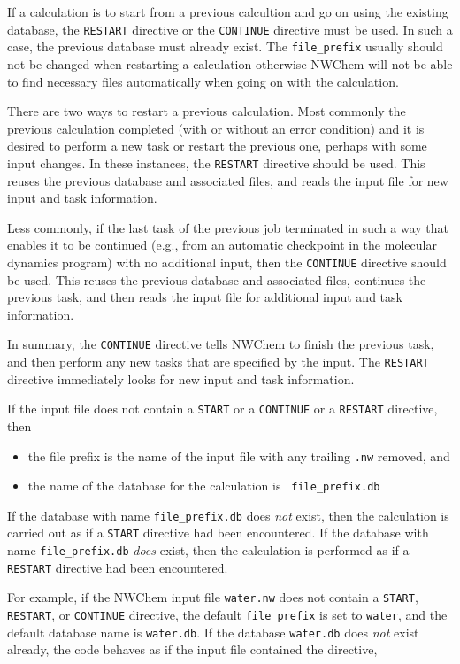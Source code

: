If a calculation is to start from a previous calcultion and go on
using the existing database, the \verb+RESTART+ directive or the
\verb+CONTINUE+ directive must be used.  In such a case, the previous
database must already exist.  The {\tt file\_prefix} usually should
not be changed when restarting a calculation otherwise NWChem will not
be able to find necessary files automatically when going on with the
calculation.

There are two ways to restart a previous calculation.  Most commonly
the previous calculation completed (with or without an error
condition) and it is desired to perform a new task or restart the
previous one, perhaps with some input changes.  In these instances,
the \verb+RESTART+ directive should be used.  This reuses the previous
database and associated files, and reads the input file for new input
and task information.

Less commonly, if the last task of the previous job terminated in such
a way that enables it to be continued (e.g., from an automatic
checkpoint in the molecular dynamics program) with no additional
input, then the \verb+CONTINUE+ directive should be used.  This reuses
the previous database and associated files, continues the previous
task, and then reads the input file for additional input and task
information.

In summary, the \verb+CONTINUE+ directive tells NWChem to finish the
previous task, and then perform any new tasks that are specified by
the input. The \verb+RESTART+ directive immediately looks for new
input and task information.

If the input file does not contain a \verb+START+ or a \verb+CONTINUE+ or a
\verb+RESTART+ directive, then
\begin{itemize}
  \item the file prefix is the name of the input file with any
    trailing \verb+.nw+ removed, and
  \item the name of the database for the calculation is {\tt
      file\_prefix.db}
\end{itemize}
If the database with name {\tt file\_prefix.db} does {\it not} exist,
then the calculation is carried out as if a \verb+START+ directive had
been encountered.  If the database with name {\tt file\_prefix.db}
{\it does} exist, then the calculation is performed as if a
\verb+RESTART+ directive had been encountered.  

For example, if the NWChem input file \verb+water.nw+ does not contain
a \verb+START+, \verb+RESTART+, or \verb+CONTINUE+ directive, the default
{\tt file\_prefix} is set to {\tt water}, and the default database name is
{\tt water.db}.  If the database \verb+water.db+ does {\it not} exist already,
the code behaves as if the input file contained the directive,

